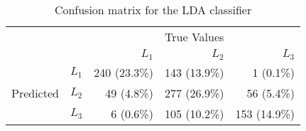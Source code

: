 \begin{table}
  \centering
  \caption{Confusion matrix for the LDA classifier}
  \label{tab:confusion_matrix_lda}
  \begin{tabular}{rrrrr}
    \toprule
    & &\multicolumn{3}{c}{True Values}\\
    & & ${L_1}$ & ${L_2}$ & ${L_3}$ \\
    \multirow{3}{*}{Predicted} & ${L_1}$ & 240 (23.3\%) & 143 (13.9\%) & 1 (0.1\%) \\
    & ${L_2}$ & 49 (4.8\%) & 277 (26.9\%) & 56 (5.4\%) \\
    & ${L_3}$ & 6 (0.6\%) & 105 (10.2\%) & 153 (14.9\%) \\\bottomrule
  \end{tabular}
\end{table}